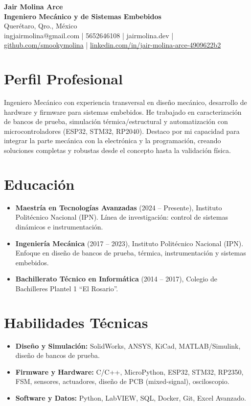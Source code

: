 \documentclass[10pt,a4paper]{article}
\begin{document}
\pagestyle{empty}

\begin{center}
    {\huge \textbf{Jair Molina Arce}} \\
    \vspace{2mm}
    {\Large \textbf{Ingeniero Mecánico y de Sistemas Embebidos}} \\
    \vspace{2mm}
    Querétaro, Qro., México \\
    ingjairmolina@gmail.com | 5652646108 | jairmolina.dev | \href{https://github.com/smookymolina}{github.com/smookymolina} | \href{https://linkedin.com/in/jair-molina-arce-4909622b2}{linkedin.com/in/jair-molina-arce-4909622b2}
\end{center}

\section*{Perfil Profesional}
Ingeniero Mecánico con experiencia transversal en diseño mecánico, desarrollo de hardware y firmware para sistemas embebidos. He trabajado en caracterización de bancos de prueba, simulación térmica/estructural y automatización con microcontroladores (ESP32, STM32, RP2040). Destaco por mi capacidad para integrar la parte mecánica con la electrónica y la programación, creando soluciones completas y robustas desde el concepto hasta la validación física.

\section*{Educación}
\begin{itemize}[leftmargin=*, noitemsep]
    \item \textbf{Maestría en Tecnologías Avanzadas} (2024 -- Presente), Instituto Politécnico Nacional (IPN). Línea de investigación: control de sistemas dinámicos e instrumentación.
    \item \textbf{Ingeniería Mecánica} (2017 -- 2023), Instituto Politécnico Nacional (IPN). Enfoque en diseño de bancos de prueba, térmica, instrumentación y sistemas embebidos.
    \item \textbf{Bachillerato Técnico en Informática} (2014 -- 2017), Colegio de Bachilleres Plantel 1 ``El Rosario''.
\end{itemize}

\section*{Habilidades Técnicas}
\begin{itemize}[leftmargin=*, noitemsep]
    \item \textbf{Diseño y Simulación:} SolidWorks, ANSYS, KiCad, MATLAB/Simulink, diseño de bancos de prueba.
    \item \textbf{Firmware y Hardware:} C/C++, MicroPython, ESP32, STM32, RP2350, FSM, sensores, actuadores, diseño de PCB (mixed-signal), osciloscopio.
    \item \textbf{Software y Datos:} Python, LabVIEW, SQL, Docker, Git, Excel Avanzado.
\end{itemize}
\end{document}
